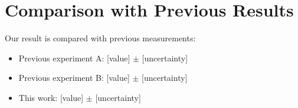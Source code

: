 \section{Comparison with Previous Results}
\label{sec:RESULTS_COMPARISON_WITH_PREVIOUS_RESULTS}

Our result is compared with previous measurements:
\begin{itemize}
  \item Previous experiment A: [value] $\pm$ [uncertainty]
  \item Previous experiment B: [value] $\pm$ [uncertainty]
  \item This work: [value] $\pm$ [uncertainty]
\end{itemize}

